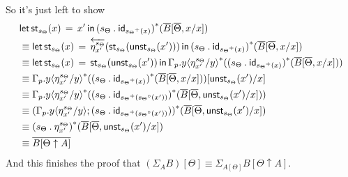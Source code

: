 \documentclass[10pt]{article}
\theoremstyle{definition}
\newcommand{\rewrite}[2]{\overleftarrow{#1}(#2)}
\newcommand\St[2]{\ensuremath{{#1}^*(#2)}}
\newcommand\StI[2]{\ensuremath{\mathsf{st}_{#1}(#2)}}
\newcommand\UnSt[2]{\ensuremath{\mathsf{unst}_{#1}(#2)}}
\newcommand\StE[4]{\ensuremath{\mathsf{let} \, \StI{#1}{#3} \, = \, {#2} \, \mathsf{in} \, #4}}
\newcommand\TrPlus[2]{\ensuremath{{#1}^+(#2)}}
\newcommand\TrCirc[2]{\ensuremath{{#1}^\circ(#2)}}
\newcommand{\id}{\mathsf{id}}
\newcommand\ap[2]{\ensuremath{#1 \langle #2 \rangle }}
\newcommand\bdot[0]{\mathbin{.}}
\begin{document}
\begin{enumerate}[style = multiline, labelwidth = 80pt]
So it's just left to show
\begin{align*}
&\StE{s_\Theta}{x'}{x}{\St{(s_\Theta \bdot \id_{\TrPlus{s_\Theta}{x}})}{\upstairs{B}[\upstairs{\Theta}, x/x]}} \\
&\equiv \StE{s_\Theta}{\rewrite{\eta^{s_\Theta}_{x'}}{\StI{s_\Theta}{\UnSt{s_\Theta}{x'}}}}{x}{\St{(s_\Theta \bdot \id_{\TrPlus{s_\Theta}{x}})}{\upstairs{B}[\upstairs{\Theta}, x/x]}} \\
&\equiv \StE{s_\Theta}{\StI{s_\Theta}{\UnSt{s_\Theta}{x'}}}{x}{\St{\ap{\asdep{\Gamma}.y}{\eta^{s_\Theta}_{x'}/y}}{\St{(s_\Theta \bdot \id_{\TrPlus{s_\Theta}{x}})}{\upstairs{B}[\upstairs{\Theta}, x/x]}}} \\
&\equiv \St{\ap{\asdep{\Gamma}.y}{\eta^{s_\Theta}_{x'}/y}}{\St{(s_\Theta \bdot \id_{\TrPlus{s_\Theta}{x}})}{\upstairs{B}[\upstairs{\Theta}, x/x]}}[\UnSt{s_\Theta}{x'}/x] \\
&\equiv \St{\ap{\asdep{\Gamma}.y}{\eta^{s_\Theta}_{x'}/y}}{\St{(s_\Theta \bdot \id_{\TrPlus{s_\Theta}{\TrCirc{s_\Theta}{x'}}})}{\upstairs{B}[\upstairs{\Theta}, \UnSt{s_\Theta}{x'}/x]}} \\
&\equiv \St{(\ap{\asdep{\Gamma}.y}{\eta^{s_\Theta}_{x'}/y};(s_\Theta \bdot \id_{\TrPlus{s_\Theta}{\TrCirc{s_\Theta}{x'}}}))}{\upstairs{B}[\upstairs{\Theta}, \UnSt{s_\Theta}{x'}/x]} \\
&\equiv \St{(s_\Theta \bdot \eta^{s_\Theta}_{x'})}{\upstairs{B}[\upstairs{\Theta}, \UnSt{s_\Theta}{x'}/x]} \\
&\equiv \upstairs{B[\Theta \uparrow A]}
\end{align*}
And this finishes the proof that $(\Sigma_A B)[\Theta] \equiv \Sigma_{A[\Theta]} B[\Theta \uparrow A]$.


\end{enumerate}
\end{document}
